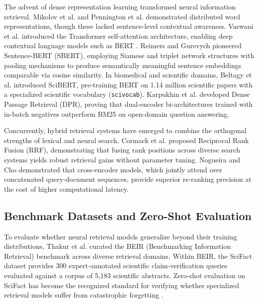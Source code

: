 \documentclass[journal]{IEEEtran}
\begin{document}
The advent of dense representation learning transformed neural information retrieval. Mikolov et al. \cite{mikolov2013efficient} and Pennington et al. \cite{pennington2014glove} demonstrated distributed word representations, though these lacked sentence-level contextual awareness. Vaswani et al. \cite{vaswani2017attention} introduced the Transformer self-attention architecture, enabling deep contextual language models such as BERT \cite{devlin2019bert}. Reimers and Gurevych \cite{reimers2019sentence} pioneered Sentence-BERT (SBERT), employing Siamese and triplet network structures with pooling mechanisms to produce semantically meaningful sentence embeddings comparable via cosine similarity. In biomedical and scientific domains, Beltagy et al. \cite{beltagy2019scibert} introduced SciBERT, pre-training BERT on 1.14 million scientific papers with a specialized scientific vocabulary (\texttt{scivocab}). Karpukhin et al. \cite{karpukhin2020dense} developed Dense Passage Retrieval (DPR), proving that dual-encoder bi-architectures trained with in-batch negatives outperform BM25 on open-domain question answering.

Concurrently, hybrid retrieval systems have emerged to combine the orthogonal strengths of lexical and neural search. Cormack et al. \cite{cormack2009reciprocal} proposed Reciprocal Rank Fusion (RRF), demonstrating that fusing rank positions across diverse search systems yields robust retrieval gains without parameter tuning. Nogueira and Cho \cite{nogueira2019passage} demonstrated that cross-encoder models, which jointly attend over concatenated query-document sequences, provide superior re-ranking precision at the cost of higher computational latency.

\subsection{Benchmark Datasets and Zero-Shot Evaluation}
To evaluate whether neural retrieval models generalize beyond their training distributions, Thakur et al. \cite{thakur2021beir} curated the BEIR (Benchmarking Information Retrieval) benchmark across diverse retrieval domains. Within BEIR, the SciFact dataset \cite{wadden2020fact} provides 300 expert-annotated scientific claim-verification queries evaluated against a corpus of 5,183 scientific abstracts. Zero-shot evaluation on SciFact has become the recognized standard for verifying whether specialized retrieval models suffer from catastrophic forgetting \cite{mccloskey1989catastrophic}.
\end{document}
